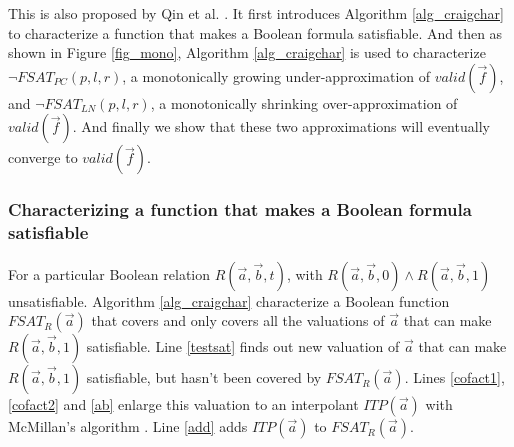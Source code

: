\documentclass[runningheads,a4paper,orivec]{llncs}
\begin{document}

This is also proposed by Qin et al. \cite{QinTODAES15}.
It first introduces Algorithm \ref{alg_craigchar} to characterize a function 
that makes a Boolean formula satisfiable.
And then as shown in Figure \ref{fig_mono},
Algorithm \ref{alg_craigchar} is used to characterize $\neg FSAT_{PC}(p,l,r)$,
a monotonically growing under-approximation of $valid(\vec{f})$,
and $\neg FSAT_{LN}(p,l,r)$,
a monotonically shrinking over-approximation of $valid(\vec{f})$.
And finally we show that these two approximations will eventually converge to $valid(\vec{f})$.



\subsubsection{Characterizing a function that makes a Boolean formula satisfiable}\label{subsubsec_craig}

For a particular Boolean relation $R(\vec{a},\vec{b},t)$, 
with $R(\vec{a},\vec{b},0)\wedge R(\vec{a},\vec{b},1)$ unsatisfiable.
Algorithm \ref{alg_craigchar} characterize a Boolean function $FSAT_R(\vec{a})$
that covers and only covers all the valuations of $\vec{a}$ 
that can make $R(\vec{a},\vec{b},1)$ satisfiable.
Line \ref{testsat} finds out new valuation of $\vec{a}$ that can make $R(\vec{a},\vec{b},1)$ satisfiable,
but hasn't been covered by $FSAT_R(\vec{a})$.
Lines \ref{cofact1}, \ref{cofact2} and \ref{ab} enlarge this valuation 
to an interpolant $ITP(\vec{a})$ with McMillan's algorithm \cite{interp_McMillan}.
Line \ref{add} adds $ITP(\vec{a})$ to $FSAT_R(\vec{a})$.

% 
\end{document}
